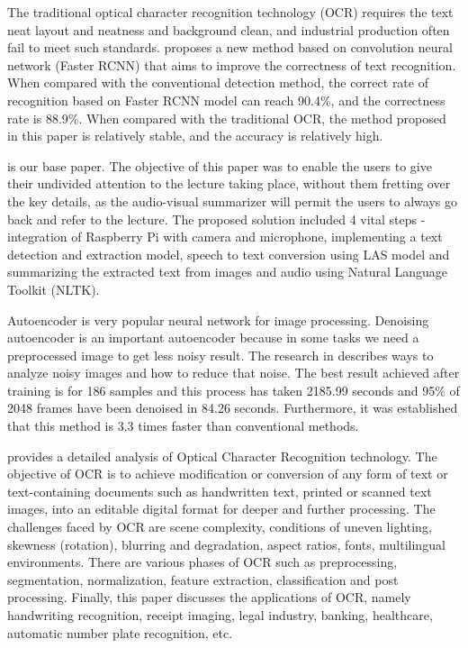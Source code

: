 The traditional optical character recognition technology (OCR) requires the text neat layout and neatness and background clean, and industrial production often fail to meet such standards. \cite{wang2017scene} proposes a new method based on convolution neural network (Faster RCNN) that aims to improve the correctness of text recognition. When compared with the conventional detection method, the correct rate of recognition based on Faster RCNN model can reach 90.4\%, and the correctness rate is 88.9\%. When compared with the traditional OCR, the method proposed in this paper is relatively stable, and the accuracy is relatively high.

\cite{bhat2018cost} is our base paper. The objective of this paper was to enable the users to give their undivided attention to the lecture taking place, without them fretting over the key details, as the audio-visual summarizer will permit the users to always go back and refer to the lecture. The proposed solution included 4 vital steps - integration of Raspberry Pi with camera and microphone, implementing a text detection and extraction model, speech to text conversion using LAS model and summarizing the extracted text from images and audio using Natural Language Toolkit (NLTK).

Autoencoder is very popular neural network for image processing. Denoising autoencoder is an important autoencoder because in some tasks we need a preprocessed image to get less noisy result. The research in \cite{yasenko2020image} describes ways to analyze noisy images and how to reduce that noise. The best result achieved after training is for 186 samples and this process has taken 2185.99 seconds and 95\% of 2048 frames have been denoised in 84.26 seconds. Furthermore, it was established that this method is 3.3 times faster than conventional methods.

\cite{hamad2016detailed} provides a detailed analysis of Optical Character Recognition technology. The objective of OCR is to achieve modification or conversion of any form of text or text-containing documents such as handwritten text, printed or scanned text images, into an editable digital format for deeper and further processing. The challenges faced by OCR are scene complexity, conditions of uneven lighting, skewness (rotation), blurring and degradation, aspect ratios, fonts, multilingual environments. There are various phases of OCR such as preprocessing, segmentation, normalization, feature extraction, classification and post processing. Finally, this paper discusses the applications of OCR, namely handwriting recognition, receipt imaging, legal industry, banking, healthcare, automatic number plate recognition, etc.

